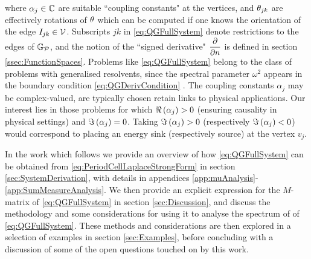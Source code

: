 where $\alpha_j\in\mathbb{C}$ are suitable ``coupling constants" at the vertices, and $\theta_{jk}$ are effectively rotations of $\theta$ which can be computed if one knows the orientation of the edge $I_{jk}\in\mathcal{V}$.
Subscripts $jk$ in \eqref{eq:QGFullSystem} denote restrictions to the edges of $\mathbb{G}_{\mathcal{P}}$, and the notion of the ``signed derivative" $\dfrac{\partial }{\partial n}$ is defined in section \ref{ssec:FunctionSpaces}.
Problems like \eqref{eq:QGFullSystem} belong to the class of problems with generalised resolvents, since the spectral parameter $\omega^2$ appears in the boundary condition \eqref{eq:QGDerivCondition} \cite{strauss1954generalized, strauss1968extensions, strauss1998functional, cherednichenko2018effective}.
The coupling constants $\alpha_j$ may be complex-valued, are typically chosen retain links to physical applications.
Our interest lies in those problems for which $\Re\left( \alpha_j \right)>0$ (ensuring causality in physical settings) and $\Im\left( \alpha_j \right)=0$.
Taking $\Im\left( \alpha_j \right)>0$ (respectively $\Im\left( \alpha_j \right)<0$) would correspond to placing an energy sink (respectively source) at the vertex $v_j$.

In the work which follows we provide an overview of how \eqref{eq:QGFullSystem} can be obtained from \eqref{eq:PeriodCellLaplaceStrongForm} in section \ref{sec:SystemDerivation}, with details in appendices \ref{app:muAnalysis}-\ref{app:SumMeasureAnalysis}.
We then provide an explicit expression for the $M$-matrix of \eqref{eq:QGFullSystem} in section \ref{sec:Discussion}, and discuss the methodology and some considerations for using it to analyse the spectrum of of \eqref{eq:QGFullSystem}.
These methods and considerations are then explored in a selection of examples in section \ref{sec:Examples}, before concluding with a discussion of some of the open questions touched on by this work.